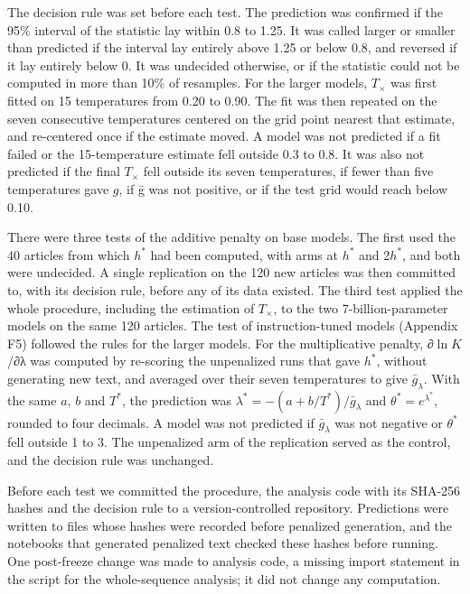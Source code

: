 \documentclass[aps,prx,onecolumn,superscriptaddress,longbibliography]{revtex4-2}
\begin{document}
The decision rule was set before each test. The prediction was confirmed if the 95\% interval of the statistic lay within 0.8 to 1.25. It was called larger or smaller than predicted if the interval lay entirely above 1.25 or below 0.8, and reversed if it lay entirely below 0. It was undecided otherwise, or if the statistic could not be computed in more than 10\% of resamples. For the larger models, \(T_{\times}\) was first fitted on 15 temperatures from 0.20 to 0.90. The fit was then repeated on the seven consecutive temperatures centered on the grid point nearest that estimate, and re-centered once if the estimate moved. A model was not predicted if a fit failed or the 15-temperature estimate fell outside 0.3 to 0.8. It was also not predicted if the final \(T_{\times}\) fell outside its seven temperatures, if fewer than five temperatures gave \(g\), if ḡ was not positive, or if the test grid would reach below 0.10.

There were three tests of the additive penalty on base models. The first used the 40 articles from which \(h^*\) had been computed, with arms at \(h^*\) and 2\(h^*\), and both were undecided. A single replication on the 120 new articles was then committed to, with its decision rule, before any of its data existed. The third test applied the whole procedure, including the estimation of \(T_{\times}\), to the two 7-billion-parameter models on the same 120 articles. The test of instruction-tuned models (Appendix F5) followed the rules for the larger models. For the multiplicative penalty, ∂\(\ln K\)/∂λ was computed by re-scoring the unpenalized runs that gave \(h^*\), without generating new text, and averaged over their seven temperatures to give \(\bar{g}_{\lambda}\). With the same \(a\), \(b\) and \(T^*\), the prediction was \(\lambda^*=-(a+b/T^*)/\bar{g}_\lambda\) and \(\theta^*=e^{\lambda^*}\), rounded to four decimals. A model was not predicted if \(\bar{g}_{\lambda}\) was not negative or \(\theta^*\) fell outside 1 to 3. The unpenalized arm of the replication served as the control, and the decision rule was unchanged.

Before each test we committed the procedure, the analysis code with its SHA-256 hashes and the decision rule to a version-controlled repository. Predictions were written to files whose hashes were recorded before penalized generation, and the notebooks that generated penalized text checked these hashes before running. One post-freeze change was made to analysis code, a missing import statement in the script for the whole-sequence analysis; it did not change any computation.
\end{document}
